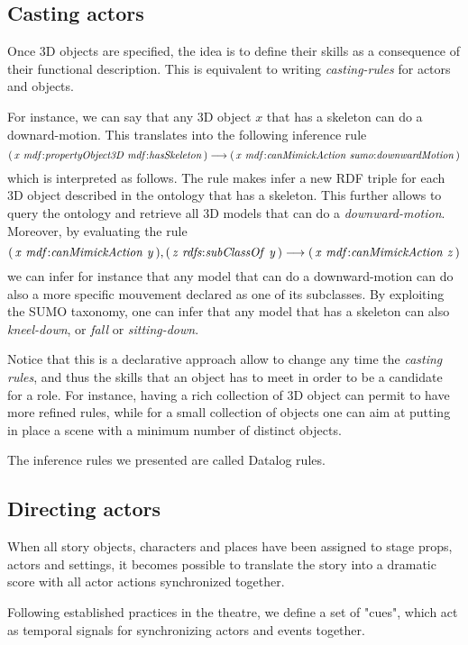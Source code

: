 \documentclass[a4paper,UKenglish]{oasics}
\newcommand{\ns}{mdf{:}}
\newcommand{\triple}[3]{{\it(\,#1\,\,#2\,\,#3\,)}}
\begin{document}
\subsection{Casting actors}
Once 3D objects are specified, the idea is to define their skills as a consequence of their functional description.
This is equivalent to writing \emph{casting-rules}  for actors and objects.

For instance, we can say that any 3D object $x$ that has a skeleton can do a downard-motion. 
This translates into the following inference rule 
$$
\triple{x}{\ns propertyObject3D}{\ns hasSkeleton}
\longrightarrow
\triple{x}{\ns canMimickAction}{sumo{:} downwardMotion}
$$
which is interpreted as follows. The rule makes infer a new RDF triple for each 3D object described in the ontology that has a skeleton. 
This further allows to query the ontology and retrieve all 3D models that can do a \emph{downward-motion}.
Moreover, by evaluating the rule 
$$
\triple{x}{\ns canMimickAction}{y} , \triple{z}{rdfs{:}subClassOf}{y}
\longrightarrow
\triple{x}{\ns canMimickAction}{z}
$$
we can infer for instance that any model that can do a downward-motion can do also a more specific mouvement declared as one of its subclasses. By exploiting the SUMO taxonomy, one can infer that any model that has a skeleton can also \emph{kneel-down}, or \emph{fall} or \emph{sitting-down}.

\smallskip
Notice that this is a declarative approach allow to change any time the \emph{casting rules}, and thus the skills that an object has to meet in order to be a candidate for a role. For instance, having a rich collection of 3D object can permit to have more refined rules, while for a small collection of objects one can aim at putting in place a scene with a minimum number of distinct objects.

\smallskip
The inference rules we presented are called Datalog rules.

\subsection{Directing actors}

When all story objects, characters and places have been assigned to stage props, actors and settings,
it becomes possible to translate the story into a dramatic score with  all actor actions synchronized
together.

Following established practices in the theatre, we define a set of "cues", which act as temporal signals
for synchronizing actors and events together.
\end{document}
